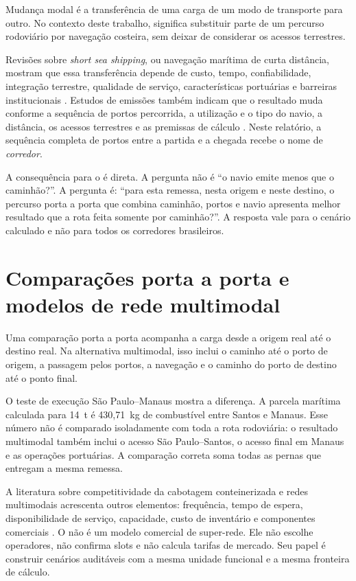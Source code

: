 Mudança modal é a transferência de uma carga de um modo de transporte para outro. No contexto deste trabalho, significa substituir parte de um percurso rodoviário por navegação costeira, sem deixar de considerar os acessos terrestres.

Revisões sobre \emph{short sea shipping}, ou navegação marítima de curta distância, mostram que essa transferência depende de custo, tempo, confiabilidade, integração terrestre, qualidade de serviço, características portuárias e barreiras institucionais \cite{modalshiftreview2020}. Estudos de emissões também indicam que o resultado muda conforme a sequência de portos percorrida, a utilização e o tipo do navio, a distância, os acessos terrestres e as premissas de cálculo \cite{shortsea2019}. Neste relatório, a sequência completa de portos entre a partida e a chegada recebe o nome de \emph{corredor}.

A consequência para o \CabotageLens{} é direta. A pergunta não é ``o navio emite menos que o caminhão?''. A pergunta é: ``para esta remessa, nesta origem e neste destino, o percurso porta a porta que combina caminhão, portos e navio apresenta melhor resultado que a rota feita somente por caminhão?''. A resposta vale para o cenário calculado e não para todos os corredores brasileiros.

\section{Comparações porta a porta e modelos de rede multimodal}
\label{sec:porta-a-porta}

Uma comparação porta a porta acompanha a carga desde a origem real até o destino real. Na alternativa multimodal, isso inclui o caminho até o porto de origem, a passagem pelos portos, a navegação e o caminho do porto de destino até o ponto final.

O teste de execução São Paulo--Manaus mostra a diferença. A parcela marítima calculada para 14~t é 430,71~kg de combustível entre Santos e Manaus. Esse número não é comparado isoladamente com toda a rota rodoviária: o resultado multimodal também inclui o acesso São Paulo--Santos, o acesso final em Manaus e as operações portuárias. A comparação correta soma todas as pernas que entregam a mesma remessa.

A literatura sobre competitividade da cabotagem conteinerizada e redes multimodais acrescenta outros elementos: frequência, tempo de espera, disponibilidade de serviço, capacidade, custo de inventário e componentes comerciais \cite{competitiveness2024}. O \CabotageLens{} não é um modelo comercial de super-rede. Ele não escolhe operadores, não confirma slots e não calcula tarifas de mercado. Seu papel é construir cenários auditáveis com a mesma unidade funcional e a mesma fronteira de cálculo.

